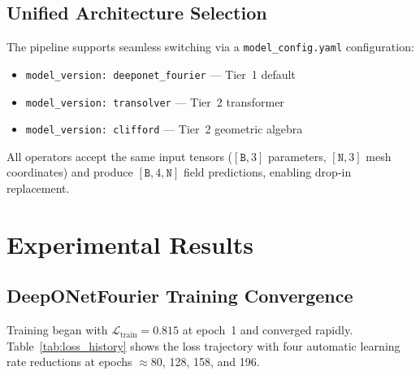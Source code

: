 \documentclass[conference]{IEEEtran}
\begin{document}
\subsection{Unified Architecture Selection}

The pipeline supports seamless switching via a \texttt{model\_config.yaml} configuration:
\begin{itemize}
    \item \texttt{model\_version: deeponet\_fourier} --- Tier~1 default
    \item \texttt{model\_version: transolver} --- Tier~2 transformer
    \item \texttt{model\_version: clifford} --- Tier~2 geometric algebra
\end{itemize}
All operators accept the same input tensors ($[\texttt{B},3]$ parameters, $[\texttt{N},3]$ mesh coordinates) and produce $[\texttt{B},4,\texttt{N}]$ field predictions, enabling drop-in replacement.

\section{Experimental Results}
\label{sec:results}

\subsection{DeepONetFourier Training Convergence}

Training began with $\mathcal{L}_\text{train} = 0.815$ at epoch~1 and converged rapidly. Table~\ref{tab:loss_history} shows the loss trajectory with four automatic learning rate reductions at epochs $\approx$80, 128, 158, and 196.
\end{document}
